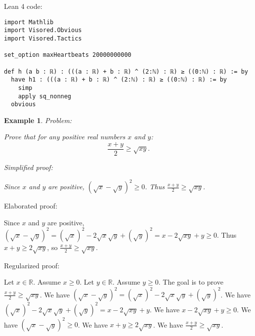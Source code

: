\documentclass{article}
\newtheorem{example}{Example}
\begin{document}
Lean 4 code:
\begin{tcolorbox}[colback=white!10, width=\linewidth]
\begin{lstlisting}[language=Lean4]
import Mathlib
import Visored.Obvious
import Visored.Tactics

set_option maxHeartbeats 20000000000

def h (a b : ℝ) : (((a : ℝ) + b : ℝ) ^ (2:ℕ) : ℝ) ≥ ((0:ℕ) : ℝ) := by
  have h1 : (((a : ℝ) + b : ℝ) ^ (2:ℕ) : ℝ) ≥ ((0:ℕ) : ℝ) := by
    simp
    apply sq_nonneg
  obvious

\end{lstlisting}
\end{tcolorbox}


\begin{example}
Problem:
\begin{tcolorbox}[colback=yellow!10, width=\linewidth]
Prove that for any positive real numbers $x$ and $y$:
    $$\frac{x+y}{2} \geq \sqrt{xy}.$$
\end{tcolorbox}

Simplified proof:
\begin{tcolorbox}[colback=blue!10, width=\linewidth]
Since $x$ and $y$ are positive, $(\sqrt x - \sqrt y)^2 \ge 0$. Thus $\frac{x+y}{2} \ge \sqrt{xy}$.
\end{tcolorbox}
\end{example}

Elaborated proof:
\begin{tcolorbox}[colback=green!10, width=\linewidth]
Since $x$ and $y$ are positive, $(\sqrt x - \sqrt y)^2 = (\sqrt x)^2 - 2\sqrt x \sqrt y + (\sqrt y)^2 = x - 2\sqrt{xy} + y \ge 0$. Thus $x + y \ge 2\sqrt{xy}$, so $\frac{x+y}{2} \ge \sqrt{xy}$.
\end{tcolorbox}

Regularized proof:
\begin{tcolorbox}[colback=red!10, width=\linewidth]
Let $x\in\mathbb{R}$. Assume $x\ge 0$.
Let $y\in\mathbb{R}$. Assume $y\ge 0$.
The goal is to prove $\frac{x+y}{2} \ge \sqrt{xy}$.
We have ${{(\sqrt x - \sqrt y)}}^2 = {{(\sqrt x)}}^2 - 2\sqrt x \sqrt y + {{(\sqrt y)}}^2$.
We have ${{(\sqrt x)}}^2 - 2\sqrt x \sqrt y + {{(\sqrt y)}}^2 = x - 2\sqrt{xy} + y$.
We have $x - 2\sqrt{xy} + y \ge 0$.
We have ${{(\sqrt x - \sqrt y)}}^2 \ge 0$.
We have $x + y \ge 2\sqrt{xy}$.
We have $\frac{x+y}{2} \ge \sqrt{xy}$.
\end{tcolorbox}
\end{document}
